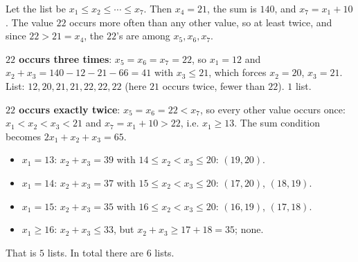 Let the list be $x_1\le x_2\le\cdots\le x_7$. Then $x_4=21$, the sum is $140$, and $x_7=x_1+10$. The value $22$ occurs more often than any other value, so at least twice, and since $22>21=x_4$, the $22$'s are among $x_5,x_6,x_7$.

\textbf{$22$ occurs three times}: $x_5=x_6=x_7=22$, so $x_1=12$ and $x_2+x_3=140-12-21-66=41$ with $x_3\le21$, which forces $x_2=20$, $x_3=21$. List: $12,20,21,21,22,22,22$ (here $21$ occurs twice, fewer than $22$). \quad $1$ list.

\textbf{$22$ occurs exactly twice}: $x_5=x_6=22<x_7$, so every other value occurs once: $x_1<x_2<x_3<21$ and $x_7=x_1+10>22$, i.e. $x_1\ge13$. The sum condition becomes $2x_1+x_2+x_3=65$.
\begin{itemize}
\item $x_1=13$: $x_2+x_3=39$ with $14\le x_2<x_3\le20$: $(19,20)$.
\item $x_1=14$: $x_2+x_3=37$ with $15\le x_2<x_3\le20$: $(17,20)$, $(18,19)$.
\item $x_1=15$: $x_2+x_3=35$ with $16\le x_2<x_3\le20$: $(16,19)$, $(17,18)$.
\item $x_1\ge16$: $x_2+x_3\le33$, but $x_2+x_3\ge17+18=35$; none.
\end{itemize}
That is $5$ lists. In total there are $\boxed{6}$ lists.
